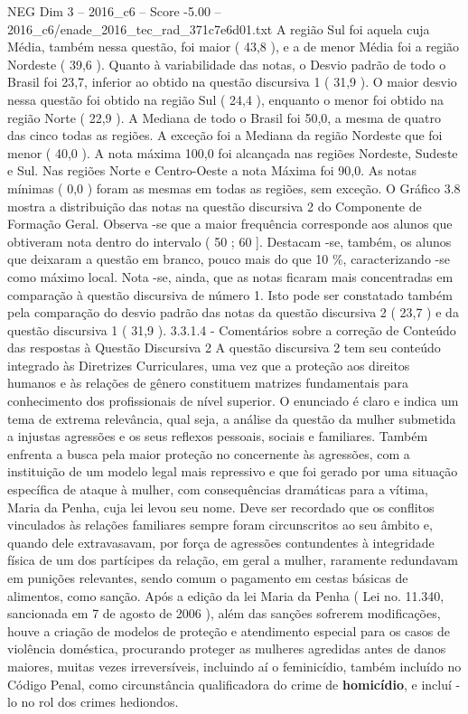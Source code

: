 \begin{textsample}{NEG Dim 3 – 2016\_c6 – Score -5.00 – 2016\_c6/enade\_2016\_tec\_rad\_371c7e6d01.txt}
A região Sul foi aquela cuja Média, também nessa questão, foi maior ( 43,8 ), e a de menor Média foi a região Nordeste ( 39,6 ).
Quanto à variabilidade das notas, o Desvio padrão de todo o Brasil foi 23,7, inferior ao obtido na questão discursiva 1 ( 31,9 ).
O maior desvio nessa questão foi obtido na região Sul ( 24,4 ), enquanto o menor foi obtido na região Norte ( 22,9 ).
A Mediana de todo o Brasil foi 50,0, a mesma de quatro das cinco todas as regiões.
A exceção foi a Mediana da região Nordeste que foi menor ( 40,0 ).
A nota máxima 100,0 foi alcançada nas regiões Nordeste, Sudeste e Sul.
Nas regiões Norte e Centro-Oeste a nota Máxima foi 90,0.
As notas mínimas ( 0,0 ) foram as mesmas em todas as regiões, sem exceção.
O Gráfico 3.8 mostra a distribuição das notas na questão discursiva 2 do Componente de Formação Geral.
Observa -se que a maior frequência corresponde aos alunos que obtiveram nota dentro do intervalo ( 50 ; 60 ].
Destacam -se, também, os alunos que deixaram a questão em branco, pouco mais do que 10 \%, caracterizando -se como máximo local.
Nota -se, ainda, que as notas ficaram mais concentradas em comparação à questão discursiva de número 1.
Isto pode ser constatado também pela comparação do desvio padrão das notas da questão discursiva 2 ( 23,7 ) e da questão discursiva 1 ( 31,9 ). 3.3.1.4 - Comentários sobre a correção de Conteúdo das respostas à Questão Discursiva 2 A questão discursiva 2 tem seu conteúdo integrado às Diretrizes Curriculares, uma vez que a proteção aos direitos humanos e às relações de gênero constituem matrizes fundamentais para conhecimento dos profissionais de nível superior.
O enunciado é claro e indica um tema de extrema relevância, qual seja, a análise da questão da mulher submetida a injustas agressões e os seus reflexos pessoais, sociais e familiares.
Também enfrenta a busca pela maior proteção no concernente às agressões, com a instituição de um modelo legal mais repressivo e que foi gerado por uma situação específica de ataque à mulher, com consequências dramáticas para a vítima, Maria da Penha, cuja lei levou seu nome.
Deve ser recordado que os conflitos vinculados às relações familiares sempre foram circunscritos ao seu âmbito e, quando dele extravasavam, por força de agressões contundentes à integridade física de um dos partícipes da relação, em geral a mulher, raramente redundavam em punições relevantes, sendo comum o pagamento em cestas básicas de alimentos, como sanção.
Após a edição da lei Maria da Penha ( Lei no. 11.340, sancionada em 7 de agosto de 2006 ), além das sanções sofrerem modificações, houve a criação de modelos de proteção e atendimento especial para os casos de violência doméstica, procurando proteger as mulheres agredidas antes de danos maiores, muitas vezes irreversíveis, incluindo aí o feminicídio, também incluído no Código Penal, como circunstância qualificadora do crime de \textbf{homicídio}, e incluí -lo no rol dos crimes hediondos.

\end{textsample}
